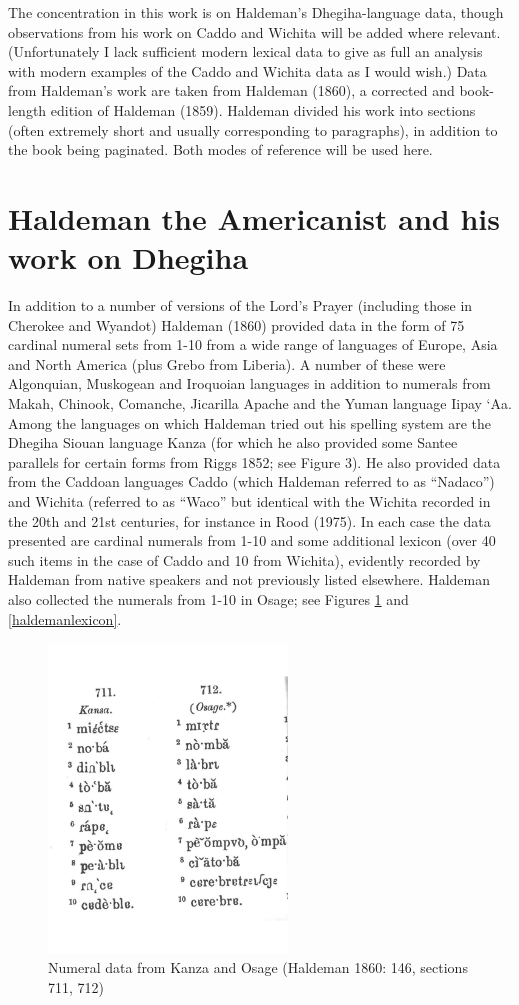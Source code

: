 \documentclass[output=paper]{LSP/langsci}
\begin{document}
The concentration in this work is on Haldeman's Dhegiha-language data, though observations from his work on Caddo and Wichita will be added where relevant. (Unfortunately I lack sufficient modern lexical data to give as full an analysis with modern examples of the Caddo and Wichita data as I would wish.)   Data from Haldeman's work are taken from Haldeman (1860), a corrected and book-length edition of Haldeman (1859).  Haldeman divided his work into sections (often extremely short and usually corresponding to paragraphs), in addition to the book being paginated.  Both modes of reference will be used here.  

\section{Haldeman the Americanist and his work on Dhegiha}  

In addition to a number of versions of the Lord's Prayer (including those in Cherokee and Wyandot) Haldeman (1860)  provided data in the form of 75 cardinal numeral sets from 1-10 from a wide range of languages of Europe, Asia and North America (plus Grebo from Liberia).  A number of these were Algonquian, Muskogean and Iroquoian languages in addition to numerals from Makah, Chinook, Comanche, Jicarilla Apache and the Yuman language Iipay `Aa. Among the languages on which Haldeman tried out his spelling system are the Dhegiha Siouan language Kanza (for which he also provided some Santee parallels for certain forms from Riggs 1852; see Figure 3).  He also provided data from the Caddoan languages Caddo (which Haldeman referred to as ``Nadaco'') and Wichita (referred to as ``Waco'' but identical with the Wichita recorded in the 20th and 21st centuries, for instance in Rood (1975). In each case the data presented are cardinal numerals from 1-10 and some additional lexicon (over 40 such items in the case of Caddo and 10 from Wichita), evidently recorded by Haldeman from native speakers and not previously listed elsewhere. Haldeman also collected the numerals from 1-10 in Osage; see Figures \ref{haldemannumerals} and \ref{haldemanlexicon}.   

\begin{figure}
\centering
\caption{Numeral data from Kanza and Osage (Haldeman 1860: 146, sections 711, 712)} \label{haldemannumerals}
\includegraphics[width=2.5in]{figures/GrantNumerals}
\end{figure}
\end{document}
